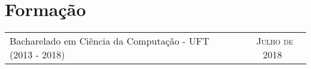 \section{Formação}

\begin{tabular}{p{11cm}|c}
  Bacharelado em Ciência da Computação - UFT (2013 - 2018) & \textsc{\ Julho de 2018}
\end{tabular}\\
